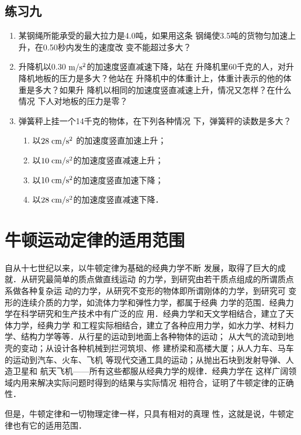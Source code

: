 \subsection*{练习九}
\begin{enumerate}
\item 某钢绳所能承受的最大拉力是4.0吨，如果用这条
钢绳使3.5吨的货物匀加速上升，在0.50秒内发生的速度改
变不能超过多大？
\item 升降机以0.30$\;\text{m}/\text{s}^2$的加速度竖直减速下降，站在
升降机里60千克的人，对升降机地板的压力是多大？他站在
升降机中的体重计上，体重计表示的他的体重是多大？如果升
降机以相同的加速度竖直减速上升，情况又怎样？在什么情况
下人对地板的压力是零？
\item 弹簧秤上挂一个14千克的物体，在下列各种情况
下，弹簧秤的读数是多大？
\begin{enumerate}
\item 以$28 \;\text{cm}/\text{s}^2$ 的加速度竖直加速上升；
\item 以$10\;\text{cm}/\text{s}^2$的加速度竖直减速上升；
\item 以$10\;\text{cm}/\text{s}^2$的加速度竖直加速下降；
\item 以$28\;\text{cm}/\text{s}^2$的加速度竖直减速下降．
\end{enumerate}
\end{enumerate}

\section{牛顿运动定律的适用范围}
    自从十七世纪以来，以牛顿定律为基础的经典力学不断
发展，取得了巨大的成就．从研究最简单的质点做直线运动
的力学，到研究由若干质点组成的所谓质点系做各种复杂运
动的力学，从研究不变形的物体即所谓刚体的力学，到研究可
变形的连续介质的力学，如流体力学和弹性力学，都属于经典
力学的范围．经典力学在科学研究和生产技术中有广泛的应
用．经典力学和天文学相结合，建立了天体力学，经典力学
和工程实际相结合，建立了各种应用力学，如水力学、材料力
学、结构力学等等．从行星的运动到地面上各种物体的运动；
从大气的流动到地壳的变动；从设计各种机械到拦河筑坝、修
建桥梁和高楼大厦；从人力车、马车的运动到汽车、火车、飞机
等现代交通工具的运动；从抛出石块到发射导弹、人造卫星和
航天飞机——所有这些都服从经典力学的规律．经典力学在
这样广阔领域内用来解决实际问题时得到的结果与实际情况
相符合，证明了牛顿定律的正确性．

    但是，牛顿定律和一切物理定律一样，只具有相对的真理
性，这就是说，牛顿定律也有它的适用范围．

